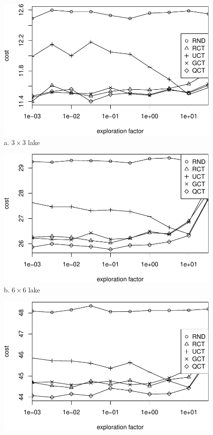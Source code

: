 \documentclass{article}
\begin{document}
\begin{figure}[ht]
  \begin{minipage}[b]{0.333\linewidth}
    \centering
    \includegraphics[scale=0.35]{costs-size=3-nsamples=397.pdf}\\
    a. $3\times 3$ lake
  \end{minipage}
  \begin{minipage}[b]{0.333\linewidth}
    \centering
    \includegraphics[scale=0.35]{costs-size=6-nsamples=397.pdf}\\
    b. $6\times 6$ lake
  \end{minipage}
  \begin{minipage}[b]{0.333\linewidth}
    \centering
    \includegraphics[scale=0.35]{costs-size=10-nsamples=397.pdf}\\

\end{minipage}
\end{figure}
\end{document}
